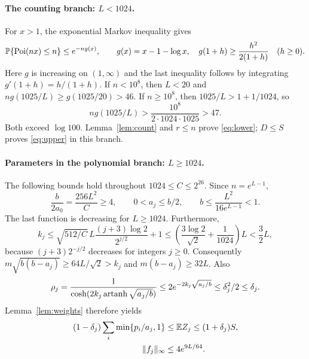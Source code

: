 \paragraph{The counting branch: $L<1024$.}
For $x>1$, the exponential Markov inequality gives
\begin{equation}
 \mathbb P\{\operatorname{Poi}(nx)\le n\}\le e^{-ng(x)},\qquad
 g(x)=x-1-\log x,\quad
 g(1+h)\ge\frac{h^2}{2(1+h)}\quad(h\ge0).
 \label{eq:chernoff}
\end{equation}
Here $g$ is increasing on $(1,\infty)$ and the last inequality follows by
integrating $g'(1+h)=h/(1+h)$. If $n<10^8$, then $L<20$ and
$ng(1025/L)\ge g(1025/20)>46$. If $n\ge10^8$, then $1025/L>1+1/1024$,
so
\[
 ng(1025/L)>\frac{10^8}{2\cdot1024\cdot1025}>47.
\]
Both exceed $\log100$. Lemma~\ref{lem:count} and $r\le n$ prove
\eqref{eq:lower}; $D\le S$ proves \eqref{eq:upper} in this branch.

\paragraph{Parameters in the polynomial branch: $L\ge1024$.}
The following bounds hold throughout $1024\le C\le2^{26}$.
Since $n=e^{L-1}$,
\begin{equation}
 \frac b{2a_0}=\frac{256L^2}{C}\ge4,\qquad
 0<a_j\le b/2,\qquad b\le\frac{L^2}{16e^{L-1}}<1.
 \label{eq:parameters}
\end{equation}
The last function is decreasing for $L\ge1024$. Furthermore,
\[
 k_j\le\sqrt{512/C}\,L\frac{(j+3)\log2}{2^{j/2}}+1
 \le\left(\frac{3\log2}{\sqrt2}+\frac1{1024}\right)L<\frac32L,
\]
because $(j+3)2^{-j/2}$ decreases for integers $j\ge0$.
Consequently $m\sqrt{b(b-a_j)}\ge64L/\sqrt2>k_j$ and
$m(b-a_j)\ge32L$. Also
\begin{equation}
 \rho_j=\frac1{\cosh(2k_j\operatorname{artanh}\sqrt{a_j/b})}
 \le2e^{-2k_j\sqrt{a_j/b}}\le\delta_j^2/2\le\delta_j.
 \label{eq:rho}
\end{equation}
Lemma~\ref{lem:weights} therefore yields
\begin{align}
 (1-\delta_j)\sum_i\min\{p_i/a_j,1\}
 &\le\mathbb E Z_j\le(1+\delta_j)S,\label{eq:means}\\
 \|f_j\|_\infty&\le4e^{9L/64}.\label{eq:uniformnorm}
\end{align}

